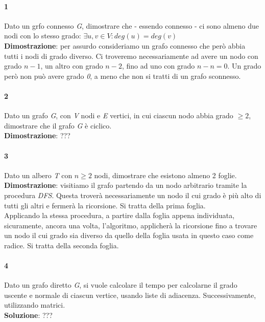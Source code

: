 \paragraph{1}
Dato un grfo connesso \textit{G}, dimostrare che - essendo connesso - ci sono almeno due nodi con lo stesso grado: $ \exists u,v \in V : deg(u) = deg(v) $ \\
\textbf{Dimostrazione}: per assurdo consideriamo un grafo connesso che però abbia tutti i nodi di grado diverso. Ci troveremo necessariamente ad avere un nodo con grado $n-1$, un altro con grado $n-2$, fino ad uno con grado $n-n = 0$. Un grado però non può avere grado \textit{0}, a meno che non si tratti di un grafo sconnesso.

\paragraph{2}
Dato un grafo \textit{G}, con \textit{V} nodi e \textit{E} vertici, in cui ciascun nodo abbia grado $\geq 2$, dimostrare che il grafo \textit{G} è ciclico. \\
\textbf{Dimostrazione}: ???

\paragraph{3}
Dato un albero \textit{T} con $n \geq 2$ nodi, dimostrare che esistono almeno 2 foglie. \\
\textbf{Dimostrazione}: visitiamo il grafo partendo da un nodo arbitrario tramite la procedura \textit{DFS}. Questa troverà necessariamente un nodo il cui grado è più alto di tutti gli altri e fermerà la ricorsione. Si tratta della prima foglia. \\
Applicando la stessa procedura, a partire dalla foglia appena individuata, sicuramente, ancora una volta, l'algoritmo, applicherà la ricorsione fino a trovare un nodo il cui grado sia diverso da quello della foglia usata in questo caso come radice. Si tratta della seconda foglia.

\paragraph{4}
Dato un grafo diretto \textit{G}, si vuole calcolare il tempo per calcolarne il grado uscente e normale di ciascun vertice, usando liste di adiacenza. Successivamente, utilizzando matrici. \\
\textbf{Soluzione}: ???